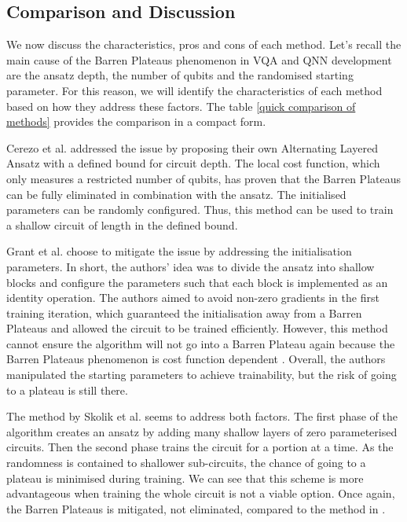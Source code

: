 \subsection{Comparison and Discussion}
We now discuss the characteristics, pros and cons of each method.
Let's recall the main cause of the Barren Plateaus phenomenon in VQA and QNN development are the ansatz depth, the number of qubits and the randomised starting parameter.
For this reason, we will identify the characteristics of each method based on how they address these factors.
The table \ref{quick comparison of methods} provides the comparison in a compact form.

Cerezo et al. \cite{cerezoCostFunctionDependent2021} addressed the issue by proposing their own Alternating Layered Ansatz with a defined bound for circuit depth.
The local cost function, which only measures a restricted number of qubits, has proven that the Barren Plateaus can be fully eliminated in combination with the ansatz. 
The initialised parameters can be randomly configured.
Thus, this method can be used to train a shallow circuit of length in the defined bound. 

Grant et al. \cite{grantInitializationStrategyAddressing2019} choose to mitigate the issue by addressing the initialisation parameters. 
In short, the authors' idea was to divide the ansatz into shallow blocks and configure the parameters such that each block is implemented as an identity operation.
The authors aimed to avoid non-zero gradients in the first training iteration, which guaranteed the initialisation away from a Barren Plateaus and allowed the circuit to be trained efficiently.
However, this method cannot ensure the algorithm will not go into a Barren Plateau again because the Barren Plateaus phenomenon is cost function dependent \cite{cerezoCostFunctionDependent2021}.
Overall, the authors manipulated the starting parameters to achieve trainability, but the risk of going to a plateau is still there.

The method by Skolik et al. \cite{skolikLayerwiseLearningQuantum2021} seems to address both factors.
The first phase of the algorithm creates an ansatz by adding many shallow layers of zero parameterised circuits. 
Then the second phase trains the circuit for a portion at a time.
As the randomness is contained to shallower sub-circuits, the chance of going to a plateau is minimised during training.
We can see that this scheme is more advantageous when training the whole circuit is not a viable option. 
Once again, the Barren Plateaus is mitigated, not eliminated, compared to the method in \cite{cerezoCostFunctionDependent2021}.

